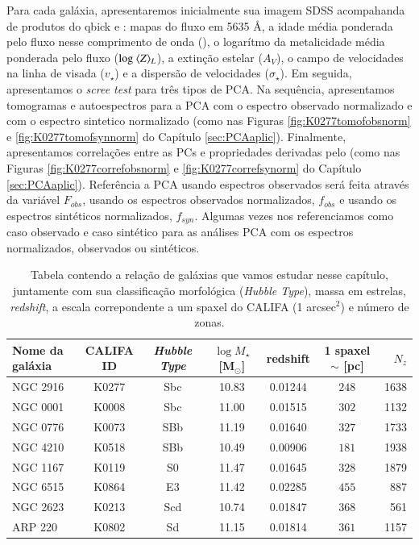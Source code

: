 Para cada galáxia, apresentaremos inicialmente sua imagem SDSS acompahanda de produtos do {\sc qbick} e \pycasso: mapas
do fluxo em 5635 \AA, a idade média ponderada pelo fluxo nesse comprimento de onda (), o logarítmo da
metalicidade média ponderada pelo fluxo ($\log\ \meanL{Z}$), a extinção estelar ($A_V$), o campo de velocidades na linha
de visada ($v_\star$) e a dispersão de velocidades ($\sigma_\star$). Em seguida, apresentamos o {\em scree test} para
três tipos de PCA. Na sequência, apresentamos tomogramas e autoespectros para a PCA com o espectro observado normalizado
e com o espectro sintetico normalizado (como nas Figuras \ref{fig:K0277tomofobsnorm} e \ref{fig:K0277tomofsynnorm} do
Capítulo \ref{sec:PCAaplic}). Finalmente, apresentamos correlações entre as PCs e propriedades derivadas pelo \starlight
(como nas Figuras \ref{fig:K0277correfobsnorm} e \ref{fig:K0277correfsynorm} do Capítulo \ref{sec:PCAaplic}).
Referência a PCA usando espectros observados será feita através da variável $F_{obs}$, usando os espectros observados
normalizados, $f_{obs}$ e usando os espectros sintéticos normalizados, $f_{syn}$. Algumas vezes nos referenciamos como
caso observado e caso sintético para as análises PCA com os espectros normalizados, observados ou sintéticos.

\begin{table}
	\caption[Relação de galáxias do CALIFA usadas neste trabalho.]
	{Tabela contendo a relação de galáxias que vamos estudar nesse capítulo, juntamente com sua classificação morfológica
	({\em Hubble Type}), massa em estrelas, {\em redshift}, a escala correpondente a um spaxel do CALIFA (1 arcsec$^2$) e
	número de zonas.}
	\begin{tabular}{l c c c c c r}
		Nome da galáxia & CALIFA ID & {\em Hubble Type} & $\log M_\star$ [M$_\odot$] & redshift & 1 spaxel $\sim$ [pc] &
		$N_z$ \\
		\midrule
		NGC 2916 & K0277 & Sbc & 10.83 & 0.01244 & $248$ & 1638 \\
		NGC 0001 & K0008 & Sbc & 11.00 & 0.01515 & $302$ & 1132 \\
		NGC 0776 & K0073 & SBb & 11.19 & 0.01640 & $327$ & 1733 \\
		NGC 4210 & K0518 & SBb & 10.49 & 0.00906 & $181$ & 1938 \\
		NGC 1167 & K0119 & S0  & 11.47 & 0.01645 & $328$ & 1879 \\
		NGC 6515 & K0864 & E3  & 11.42 & 0.02285 & $455$ & 887  \\
		NGC 2623 & K0213 & Scd & 10.74 & 0.01847 & $368$ & 561  \\
		ARP 220  & K0802 & Sd  & 11.15 & 0.01814 & $361$ & 1157 \\
	\end{tabular}
	\label{tab:amostraGalaxias}
\end{table}

